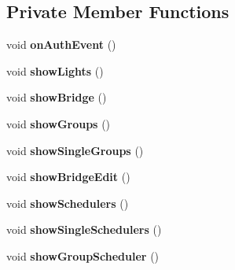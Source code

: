 \subsection*{Private Member Functions}
\begin{DoxyCompactItemize}
\item 
void {\bfseries on\+Auth\+Event} ()\hypertarget{classHueApp_af349923ea5d293c0226efd3ef71f4616}{}\label{classHueApp_af349923ea5d293c0226efd3ef71f4616}

\item 
void {\bfseries show\+Lights} ()\hypertarget{classHueApp_a3f5ea7541b2a416acd0b9f4e94073e72}{}\label{classHueApp_a3f5ea7541b2a416acd0b9f4e94073e72}

\item 
void {\bfseries show\+Bridge} ()\hypertarget{classHueApp_a9e30cb9f84bfdc63261c6273cf07d5b1}{}\label{classHueApp_a9e30cb9f84bfdc63261c6273cf07d5b1}

\item 
void {\bfseries show\+Groups} ()\hypertarget{classHueApp_a05c48b318d651f27237ab6fc3c66c33b}{}\label{classHueApp_a05c48b318d651f27237ab6fc3c66c33b}

\item 
void {\bfseries show\+Single\+Groups} ()\hypertarget{classHueApp_a096902db63e23b1efb5756010af69209}{}\label{classHueApp_a096902db63e23b1efb5756010af69209}

\item 
void {\bfseries show\+Bridge\+Edit} ()\hypertarget{classHueApp_ac7c5d1873645cd951ced6bf5216bfbc6}{}\label{classHueApp_ac7c5d1873645cd951ced6bf5216bfbc6}

\item 
void {\bfseries show\+Schedulers} ()\hypertarget{classHueApp_a889374816e88dddf42d7dc44732dbc3a}{}\label{classHueApp_a889374816e88dddf42d7dc44732dbc3a}

\item 
void {\bfseries show\+Single\+Schedulers} ()\hypertarget{classHueApp_ac5a4d1846976aca6318ab3cda3f6959e}{}\label{classHueApp_ac5a4d1846976aca6318ab3cda3f6959e}

\item 
void {\bfseries show\+Group\+Scheduler} ()\hypertarget{classHueApp_a45eff8d6e5be7df68c49673a725f1d85}{}\label{classHueApp_a45eff8d6e5be7df68c49673a725f1d85}

\end{DoxyCompactItemize}
